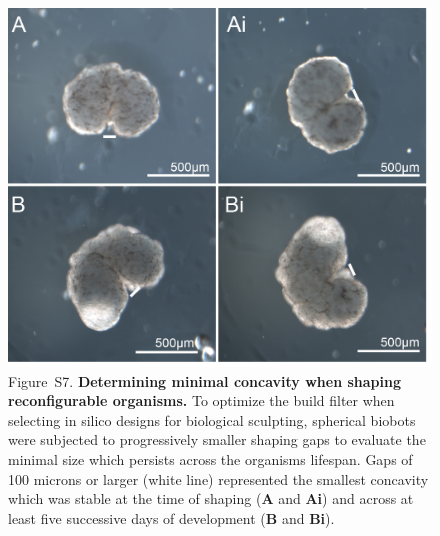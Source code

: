 \begin{figure}[t]
\centering
\includegraphics[width=0.9\linewidth]{Chapter07/img/repairpanel.jpg}
\caption*{Figure~S7.  \textbf{Determining minimal concavity when shaping reconfigurable organisms.} 
To optimize the build filter when selecting in silico designs for biological sculpting, spherical biobots were subjected to progressively smaller shaping gaps to evaluate the minimal size which persists across the organisms lifespan. 
Gaps of 100 microns or larger (white line) represented the smallest concavity which was stable at the time of shaping (\textbf{A} and \textbf{Ai}) and across at least five successive days of development (\textbf{B} and \textbf{Bi}). 
}
\end{figure}

